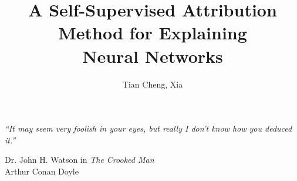 \documentclass[12pt,a4paper,openright,twoside]{report}
\title{A Self-Supervised Attribution Method for Explaining\\Neural Networks}
\author{Tian Cheng, Xia}
\begin{document}
    \makeatletter
    \def\sigillumPath{img/sigillum-negative.png}
    

    \def\sigillumPath{img/sigillum.png}
    
    

    \makeatother
    \pagestyle{plain}
    \cleardoublepage

    \vspace*{3cm}
    \begin{flushright}
        \thispagestyle{empty}
        \setlength{}
        \epigraph{\textit{“It may seem very foolish in your eyes, but really I don't know how you deduced it.”}}{Dr. John H. Watson in \textit{The Crooked Man}\\Arthur Conan Doyle}
    \end{flushright}
    \cleardoublepage

    
    \cleardoublepage

    \tableofcontents
    \cleardoublepage

    \pagestyle{fancyMainContent}
    
    
    
    
    
    
    \cleardoublepage

    \pagestyle{plain}
    \printbibliography[heading=bibintoc]

\end{document}
